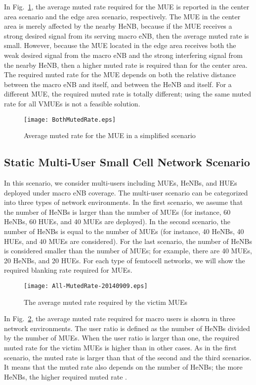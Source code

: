 \documentclass[paper]{ieice}
\begin{document}
In Fig.~\ref{SimplifiedScn}, the average muted rate required for the MUE is reported in the center area scenario and the edge area scenario, respectively. The MUE in the center area is merely affected by the nearby HeNB, because if the MUE receives a strong desired signal from its serving  macro eNB, then the average muted rate is small. However, because the MUE located in the edge area receives both the weak desired signal from the macro eNB and the strong interfering signal from the nearby HeNB, then a higher muted rate is required than for the center area. The required muted rate for the MUE depends on both the relative distance between the  macro eNB and itself, and between the HeNB and itself. For a different MUE, the required muted rate is totally different; using the same muted rate for  all VMUEs is not a feasible solution.
\begin{figure}[ht]
        \centering
         \texttt{[image: BothMutedRate.eps]}
        \caption{Average muted rate for the MUE in a simplified scenario}\label{SimplifiedScn}
\end{figure}

\subsection{Static Multi-User Small Cell Network Scenario}
\label{Eval-Static}
In this scenario, we consider multi-users including MUEs, HeNBs, and HUEs deployed under macro eNB coverage. The multi-user scenario can be categorized into three types of network environments. In the first scenario, we assume that the number of HeNBs is larger than the number of MUEs (for instance, 60 HeNBs, 60 HUEs, and 40 MUEs are deployed). In the second scenario, the number of HeNBs is equal to the number of MUEs (for instance, 40 HeNBs, 40 HUEs, and 40 MUEs are considered). For the last scenario, the number of HeNBs is considered smaller than the number of MUEs; for example, there are 40 MUEs, 20 HeNBs, and 20 HUEs. For each type of femtocell networks, we will show the required blanking rate required for MUEs.
\begin{figure}[t]
  \centering
\texttt{[image: All-MutedRate-20140909.eps]}\\
  \caption{The average muted rate required by the victim MUEs}\label{All-MutedRate}
\end{figure}

In Fig.~\ref{All-MutedRate}, the average muted rate required for macro users is shown in three network environments. The user ratio is defined as the number of HeNBs divided by the number of MUEs. When the user ratio is larger than one, the required muted rate for the victim MUEs is higher than in other cases. As in the first scenario, the muted rate  is larger than that of the second and the third scenarios. It means that the muted rate  also depends on the number of HeNBs; the more HeNBs, the higher required muted rate .
\end{document}
